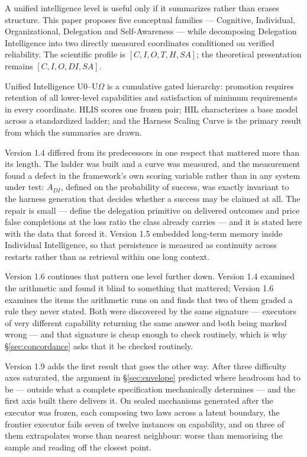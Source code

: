 \documentclass[11pt]{article}
\theoremstyle{definition}
\newcommand{\Om}{\ensuremath{\Omega}}
\begin{document}
A unified intelligence level is useful only if it summarizes rather than erases structure. This paper proposes five conceptual families --- Cognitive, Individual, Organizational, Delegation and Self-Awareness --- while decomposing Delegation Intelligence into two directly measured coordinates conditioned on verified reliability. The scientific profile is $[C, I, O, T, H, SA]$; the theoretical presentation remains $[C, I, O, DI, SA]$.

Unified Intelligence U0--U\Om{} is a cumulative gated hierarchy: promotion requires retention of all lower-level capabilities and satisfaction of minimum requirements in every coordinate. HLIS scores one frozen pair; HIL characterizes a base model across a standardized ladder; and the Harness Scaling Curve is the primary result from which the summaries are drawn.

Version 1.4 differed from its predecessors in one respect that mattered more than its length. The ladder was built and a curve was measured, and the measurement found a defect in the framework's own scoring variable rather than in any system under test: $A_{DI}$, defined on the probability of success, was exactly invariant to the harness generation that decides whether a success may be claimed at all. The repair is small --- define the delegation primitive on delivered outcomes and price false completions at the loss ratio the class already carries --- and it is stated here with the data that forced it. Version 1.5 embedded long-term memory inside Individual Intelligence, so that persistence is measured as continuity across restarts rather than as retrieval within one long context.

Version 1.6 continues that pattern one level further down. Version 1.4 examined the arithmetic and found it blind to something that mattered; Version 1.6 examines the items the arithmetic runs on and finds that two of them graded a rule they never stated. Both were discovered by the same signature --- executors of very different capability returning the same answer and both being marked wrong --- and that signature is cheap enough to check routinely, which is why \S\ref{sec:concordance} asks that it be checked routinely.

Version 1.9 adds the first result that goes the other way. After three difficulty axes saturated, the argument in \S\ref{sec:envelope} predicted where headroom had to be --- outside what a complete specification mechanically determines --- and the first axis built there delivers it. On sealed mechanisms generated after the executor was frozen, each composing two laws across a latent boundary, the frontier executor fails seven of twelve instances on capability, and on three of them extrapolates worse than nearest neighbour: worse than memorising the sample and reading off the closest point.
\end{document}
